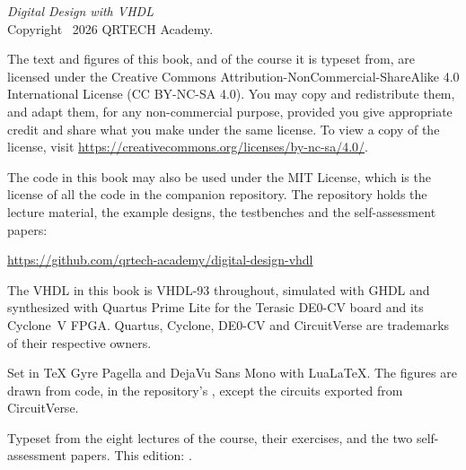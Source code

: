 \thispagestyle{empty}
\vspace*{\fill}
{\small
\noindent\textit{Digital Design with VHDL}\\
Copyright \textcopyright\ 2026 QRTECH Academy.

\medskip
\noindent The text and figures of this book, and of the course it is typeset from, are licensed
under the Creative Commons Attribution-NonCommercial-ShareAlike 4.0 International License
(CC BY-NC-SA 4.0). You may copy and redistribute them, and adapt them, for any non-commercial
purpose, provided you give appropriate credit and share what you make under the same license. To
view a copy of the license, visit \url{https://creativecommons.org/licenses/by-nc-sa/4.0/}.

\medskip
\noindent The code in this book may also be used under the MIT License, which is the license of all
the code in the companion repository. The repository holds the lecture material, the example
designs, the testbenches and the self-assessment papers:

\medskip
\noindent\url{https://github.com/qrtech-academy/digital-design-vhdl}

\medskip
\noindent The VHDL in this book is VHDL-93 throughout, simulated with GHDL and synthesized with
Quartus Prime Lite for the Terasic DE0-CV board and its Cyclone~V FPGA. Quartus, Cyclone,
DE0-CV and CircuitVerse are trademarks of their respective owners.

\medskip
\noindent Set in TeX Gyre Pagella and DejaVu Sans Mono with Lua\LaTeX. The figures are drawn from
code, in the repository's , except the circuits exported from CircuitVerse.

\medskip
\noindent\textcolor{muted}{Typeset from the eight lectures of the course, their exercises, and the
two self-assessment papers. This edition: \bookedition.}
\par}
\cleardoublepage
